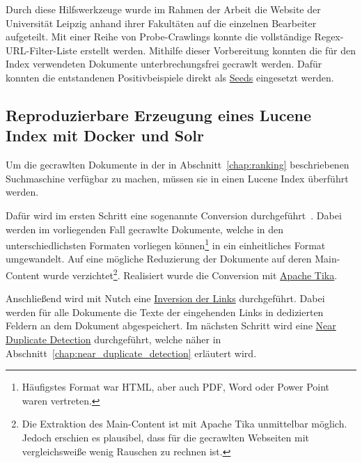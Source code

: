 

Durch diese Hilfswerkzeuge wurde im Rahmen der Arbeit die Website der Universität Leipzig anhand ihrer Fakultäten auf die einzelnen Bearbeiter aufgeteilt.
Mit einer Reihe von Probe-Crawlings konnte die vollständige Regex-URL-Filter-Liste erstellt werden.
Mithilfe dieser Vorbereitung konnten die für den Index verwendeten Dokumente unterbrechungsfrei gecrawlt werden.
Dafür konnten die entstandenen Positivbeispiele direkt als \href{https://wiki.apache.org/nutch/NutchTutorial#Create_a_URL_seed_list-1}{Seeds} eingesetzt werden.

\subsection{Reproduzierbare Erzeugung eines Lucene Index mit Docker und Solr}

Um die gecrawlten Dokumente in der in Abschnitt~\ref{chap:ranking} beschriebenen Suchmaschine verfügbar zu machen, müssen sie in einen Lucene Index überführt werden.

Dafür wird im ersten Schritt eine sogenannte Conversion durchgeführt~\cite{croft.chap2}.
Dabei werden im vorliegenden Fall gecrawlte Dokumente,
welche in den unterschiedlichsten Formaten vorliegen können\footnote{Häufigstes Format war HTML, aber auch PDF, Word oder Power Point waren vertreten.}
in ein einheitliches Format umgewandelt.
Auf eine mögliche Reduzierung der Dokumente auf deren Main-Content wurde
verzichtet\footnote{Die Extraktion des Main-Content ist mit Apache Tika
unmittelbar möglich. Jedoch erschien es plausibel, dass für die gecrawlten Webseiten mit vergleichsweiße wenig Rauschen zu rechnen ist.}.
Realisiert wurde die Conversion mit \href{https://en.wikipedia.org/wiki/Apache_Tika}{Apache Tika}.

Anschließend wird mit Nutch eine \href{https://wiki.apache.org/nutch/bin/nutch_invertlinks}{Inversion der Links} durchgeführt.
Dabei werden für alle Dokumente die Texte der eingehenden Links in dedizierten Feldern an dem Dokument abgespeichert.
Im nächsten Schritt wird eine \href{https://github.com/apache/nutch/blob/master/src/java/org/apache/nutch/crawl/TextProfileSignature.java}{Near Duplicate Detection}
durchgeführt, welche näher in Abschnitt~\ref{chap:near_duplicate_detection} erläutert wird.

